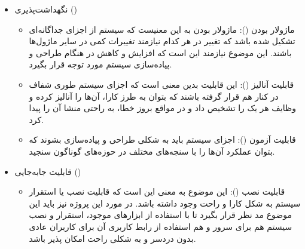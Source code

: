 \begin{itemize}
\item 
نگهداشت‌پذیری ()
\begin{itemize}
	
	\item
	ماژولار بودن (): ماژولار بودن به این معنیست که سیستم از اجزای جداگانه‌ای تشکیل شده باشد که تغییر در هر کدام نیازمند تغییرات کمی در سایر ماژول‌ها باشند. این موضوع نیازمند این است که افزایش  و کاهش  در هنگام طراحی و پیاده‌سازی سیستم مورد توجه قرار بگیرد.
	
	\item 
	قابلیت آنالیز (): این قابلیت بدین معنی است که اجزای سیستم طوری شفاف در کنار هم قرار گرفته باشند که بتوان به طرز کارا، آن‌ها را آنالیز کرده و وظایف هر یک را تشخیص داد و در مواقع بروز خطا، به راحتی منشا آن را پیدا کرد.
	
	\item 
	قابلیت آزمون (): اجزای سیستم باید به شکلی طراحی و پیاده‌سازی بشوند که بتوان عملکرد آن‌ها را با سنجه‌های مختلف در حوزه‌های گوناگون سنجید.
	
\end{itemize}


\item
قابلیت جابه‌جایی ()

\begin{itemize}
	\item
	قابلیت نصب ():
	این موضوع به معنی این است که قابلیت نصب یا استقرار سیستم به شکل کارا و راحت وجود داشته باشد. در مورد این پروژه نیز باید این موضوع مد نظر قرار بگیرد تا با استفاده از ابزارهای موجود، استقرار و نصب سیستم هم برای سرور و هم استفاده از رابط کاربری آن برای کاربران عادی بدون دردسر و به شکلی راحت امکان پذیر باشد.
	
\end{itemize}
\end{itemize}